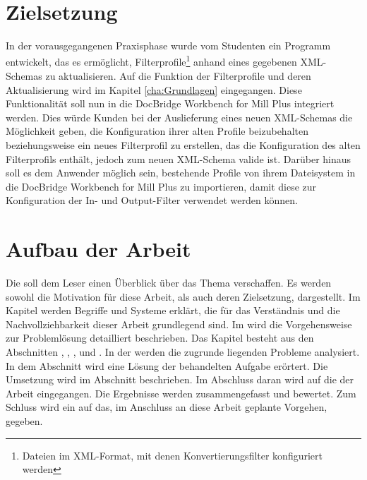 \section{Zielsetzung}{
In der vorausgegangenen Praxisphase wurde vom Studenten ein Programm entwickelt, das es ermöglicht, Filterprofile\footnote{Dateien im XML-Format, mit denen Konvertierungsfilter konfiguriert werden} anhand eines gegebenen XML-Schemas zu aktualisieren. Auf die Funktion der Filterprofile und deren Aktualisierung wird im Kapitel \ref{cha:Grundlagen} eingegangen. Diese Funktionalität soll nun in die DocBridge\textsuperscript{\textregistered} Workbench for Mill Plus integriert werden. Dies würde Kunden bei der Auslieferung eines neuen XML-Schemas die Möglichkeit geben, die Konfiguration ihrer alten Profile beizubehalten beziehungsweise ein neues Filterprofil zu erstellen, das die Konfiguration des alten Filterprofils enthält, jedoch zum neuen XML-Schema valide ist. Darüber hinaus soll es dem Anwender möglich sein, bestehende Profile von ihrem Dateisystem in die DocBridge\textsuperscript{\textregistered} Workbench for Mill Plus zu importieren, damit diese zur Konfiguration der In- und Output-Filter verwendet werden können.
}
\section{Aufbau der Arbeit}{Die  soll dem Leser einen Überblick über das Thema verschaffen. Es werden sowohl die Motivation für diese Arbeit, als auch deren Zielsetzung, dargestellt. Im Kapitel  werden Begriffe und Systeme erklärt, die für das Verständnis und die Nachvollziehbarkeit dieser Arbeit grundlegend sind. Im  wird die Vorgehensweise zur Problemlösung detailliert beschrieben. Das Kapitel besteht aus den Abschnitten , , ,  und . In der  werden die zugrunde liegenden Probleme analysiert. In dem Abschnitt  wird eine Lösung der behandelten Aufgabe erörtert. Die Umsetzung wird im Abschnitt  beschrieben. Im Abschluss daran wird auf die  der Arbeit eingegangen. Die Ergebnisse werden zusammengefasst und bewertet. Zum Schluss wird ein  auf das, im Anschluss an diese Arbeit geplante Vorgehen, gegeben.
}
 